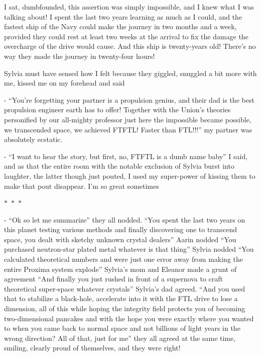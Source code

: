 \documentclass[colorlinks,12pt,a4paper]{book}
\newcommand\sep{\begin{center}
  \boldmath $\ast$~$\ast$~$\ast$
\end{center}}
\begin{document}
 I sat, dumbfounded, this assertion was simply impossible, and I knew what I was talking about! I spent the last two years 
 learning as much as I could, and the fastest ship of the Navy could make the journey in two months and a week, 
 provided they could rest at least two weeks at the arrival to fix the damage the overcharge of the drive would cause.
  And this ship is twenty-years old! There's no way they made the journey in twenty-four hours!\par
  \bigskip
 
 Sylvia must have sensed how I felt because they giggled, snuggled a bit more with me, kissed me on my forehead and said \par
 \bigskip
 - “You're forgetting your partner is a propulsion genius, and their dad is the best propulsion engineer earth has to
  offer! Together with the Union's theories personified by our all-mighty professor just here the impossible became
   possible, we transcended space, we achieved FTFTL! Faster than FTL!!!” my partner was absolutely ecstatic.\par
   \bigskip
 
 - “I want to hear the story, but first, no, FTFTL is a dumb name baby” I said, and as that the entire room with the
  notable exclusion of Sylvia burst into laughter, the latter though just pouted, I used my super-power of kissing them 
  to make that pout disappear. I'm so great sometimes
 
 \sep 
 
 - “Ok so let me summarize” they all nodded. “You spent the last two years on this planet testing various methods and 
 finally discovering one to transcend space, you dealt with sketchy unknown crystal dealers” Aarin nodded 
 “You purchased neutron-star plated metal whatever is that thing” Sylvia nodded “You calculated theoretical 
 numbers and were just one error away from making the entire Proxima system explode” Sylvia's mom and Eleanor 
 made a grunt of agreement “And finally you just rushed in front of a supernova to craft theoretical super-space
  whatever crystals” Sylvia's dad agreed. “And you used that to stabilize a black-hole, accelerate into it with the FTL drive
 to lose a dimension, all of this while hoping the integrity field protects you of becoming two-dimensional pancakes and with the hope you were 
  exactly where you wanted to when you came back to normal space and not billions of light years in the wrong direction? 
  All of that, just for me” they all agreed at the same time, smiling, clearly proud of themselves, and they were right!\par
  \bigskip
 
\end{document}
